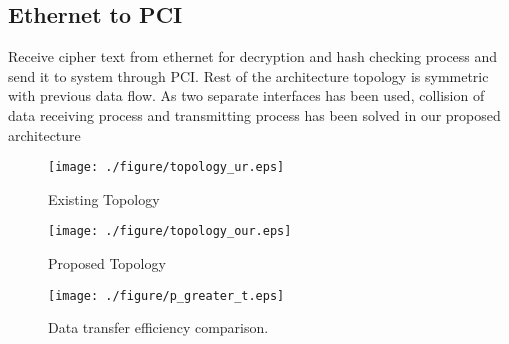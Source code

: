 \documentclass[3p,times]{elsarticle}
\begin{document}
\subsection{Ethernet to PCI}
Receive cipher text from ethernet for decryption and hash checking process and send it to system through PCI. Rest of the architecture topology is symmetric with previous data flow. As two separate interfaces has been used, collision of data receiving process and transmitting process has been solved in our proposed architecture
\begin{figure}[!hp]
\centering
\vspace{-9pt}
\texttt{[image: ./figure/topology\_ur.eps]}
\vspace{-6pt}
\caption{Existing Topology} 
\label{fig:topology_ur_fig}
\end{figure}

\begin{figure}[!hp]
\centering
\texttt{[image: ./figure/topology\_our.eps]}
\vspace{-6pt}
\caption{Proposed Topology}
\vspace{-8pt}
\label{fig:topology_our_fig}
\end{figure} 

\begin{figure}[!hp]
\centering
\texttt{[image: ./figure/p\_greater\_t.eps]}
\vspace{-6pt}
\caption{Data transfer efficiency comparison.}
\vspace{-8pt}
\label{fig:data_tran_fig}
\end{figure} 
\end{document}
